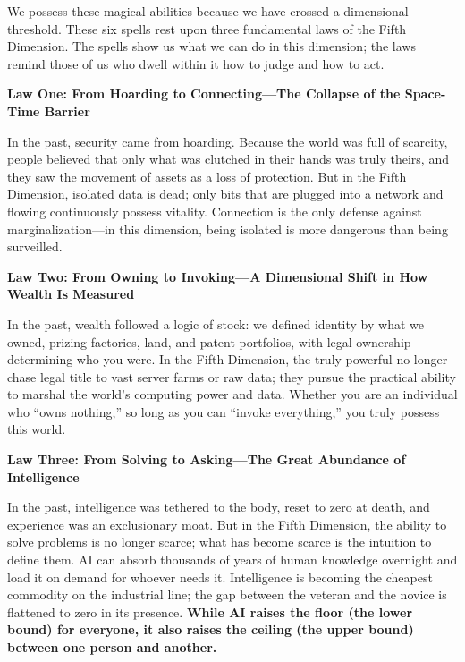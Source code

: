 We possess these magical abilities because we have crossed a dimensional threshold. These six spells rest upon three fundamental laws of the Fifth Dimension. The spells show us what we can do in this dimension; the laws remind those of us who dwell within it how to judge and how to act.

\vspace{1em}

{}
\textbf{Law One: From Hoarding to Connecting---The Collapse of the Space-Time Barrier}

In the past, security came from hoarding. Because the world was full of scarcity, people believed that only what was clutched in their hands was truly theirs, and they saw the movement of assets as a loss of protection. But in the Fifth Dimension, isolated data is dead; only bits that are plugged into a network and flowing continuously possess vitality. Connection is the only defense against marginalization---in this dimension, being isolated is more dangerous than being surveilled.

\vspace{0.8em}
{}
\textbf{Law Two: From Owning to Invoking---A Dimensional Shift in How Wealth Is Measured}

In the past, wealth followed a logic of stock: we defined identity by what we owned, prizing factories, land, and patent portfolios, with legal ownership determining who you were. In the Fifth Dimension, the truly powerful no longer chase legal title to vast server farms or raw data; they pursue the practical ability to marshal the world's computing power and data. Whether you are an individual who ``owns nothing,'' so long as you can ``invoke everything,'' you truly possess this world.

\vspace{0.8em}

{}
\textbf{Law Three: From Solving to Asking---The Great Abundance of Intelligence}

In the past, intelligence was tethered to the body, reset to zero at death, and experience was an exclusionary moat. But in the Fifth Dimension, the ability to solve problems is no longer scarce; what has become scarce is the intuition to define them. AI can absorb thousands of years of human knowledge overnight and load it on demand for whoever needs it. Intelligence is becoming the cheapest commodity on the industrial line; the gap between the veteran and the novice is flattened to zero in its presence. \textbf{While AI raises the floor (the lower bound) for everyone, it also raises the ceiling (the upper bound) between one person and another.}

